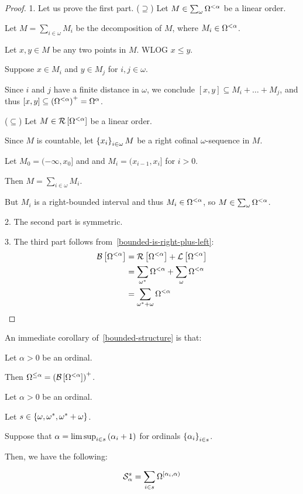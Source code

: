\begin{proof}
  1. Let us prove the first part.
  ($\supseteq$) Let $M \in \sum_{\omega}{\Omega^{< \alpha}}$ be a linear order.

  Let $M = \sum_{i \in \omega} M_i$ be the decomposition of $M$,
  where $M_i \in \Omega^{< \alpha}$.

  Let $x, y \in M$ be any two points in $M$. WLOG $x \le y$.

  Suppose $x \in M_i$ and $y \in M_j$ for $i, j \in \omega$.

  Since $i$ and $j$ have a finite distance in $\omega$,
  we conclude $[x, y] \subseteq M_i + \ldots + M_j$,
  and thus $[x, y] \subseteq \left( {\Omega^{< \alpha}} \right)^+ = \Omega^{{\alpha}}$.

  ($\subseteq$) Let $M \in \mathcal{R} \left[ {{\Omega^{< \alpha}}} \right]$ be a linear order.

  Since $M$ is countable, let $\left\{ {x_i} \right\}_{i \in \omega} M$ be a right cofinal
  $\omega$-sequence in $M$.

  Let $M_0 = (-\infty, x_0]$ and and $M_i = (x_{i-1}, x_{i}]$ for $i > 0$.

  Then $M = \sum_{i \in \omega} M_i$.

  But $M_i$ is a right-bounded interval and thus $M_i \in \Omega^{< \alpha}$, so $M \in \sum_{\omega}{\Omega^{< \alpha}}$.

  2. The second part is symmetric.

  3. The third part follows from~\cref{bounded-is-right-plus-left}:
  \[
    \begin{aligned}
      \mathcal{B} \left[ {{\Omega^{< \alpha}}} \right]
       & = \mathcal{R} \left[ {{\Omega^{< \alpha}}} \right] + \mathcal{L} \left[ {{\Omega^{< \alpha}}} \right]                     \\
       & = \sum_{\omega^\ast}{\Omega^{< \alpha}} + \sum_{\omega}{\Omega^{< \alpha}} \\
       & = \sum_{\omega^\ast + \omega}{\Omega^{< \alpha}}
    \end{aligned}
  \]
\end{proof}

An immediate corollary of~\cref{bounded-structure} is that:
\begin{corollary}
  Let $\alpha > 0$ be an ordinal.

  Then $\Omega^{\le \alpha} = \left( {\mathcal{B} \left[ {{\Omega^{< \alpha}}} \right]} \right)^+$.
\end{corollary}

\begin{lemma}\label{shape-structure}
  Let $\alpha > 0$ be an ordinal.

  Let $s \in \left\{ {\omega, \omega^\ast, \omega^\ast + \omega} \right\}$.

  Suppose that
  $\alpha = \limsup_{i \in s} \left( {\alpha_i + 1} \right)$ for
  ordinals $\left\{ {\alpha_i} \right\}_{i \in s}$.

  Then, we have the following:

  \[
    \mathcal{S}^{s}_{\alpha} = \sum_{i \in s}{\Omega^{[\alpha_i, \alpha)}}
  \]
\end{lemma}

